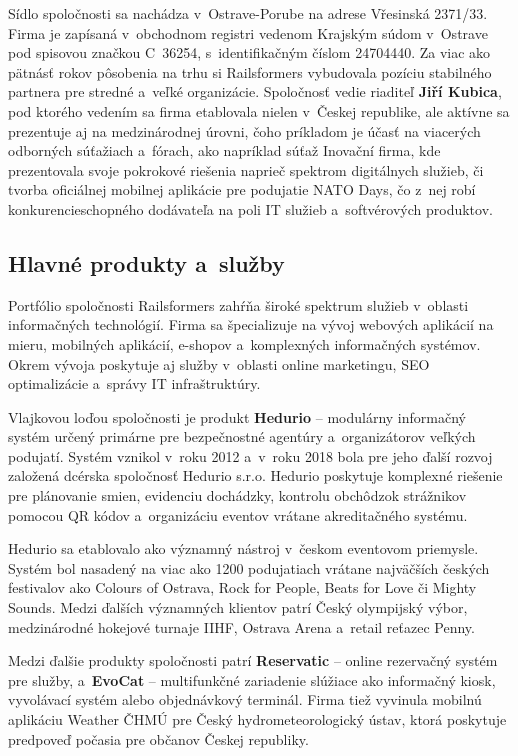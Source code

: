 Sídlo spoločnosti sa nachádza v~Ostrave-Porube na adrese Vřesinská 2371/33. Firma je zapísaná v~obchodnom registri vedenom Krajským súdom v~Ostrave pod spisovou značkou C~36254, s~identifikačným číslom 24704440. Za viac ako pätnásť rokov pôsobenia na trhu si Railsformers vybudovala pozíciu stabilného partnera pre stredné a~veľké organizácie. Spoločnosť vedie riaditeľ \textbf{Jiří Kubica}, pod ktorého vedením sa firma etablovala nielen v~Českej republike, ale aktívne sa prezentuje aj na medzinárodnej úrovni, čoho príkladom je účasť na viacerých odborných súťažiach a~fórach, ako napríklad súťaž Inovační firma, kde prezentovala svoje pokrokové riešenia naprieč spektrom digitálnych služieb, či tvorba oficiálnej mobilnej aplikácie pre podujatie NATO Days, čo z~nej robí konkurencieschopného dodávateľa na poli IT služieb a~softvérových produktov.

\subsection{Hlavné produkty a~služby}
\label{sec:Produkty}

Portfólio spoločnosti Railsformers zahŕňa široké spektrum služieb v~oblasti informačných technológií. Firma sa špecializuje na vývoj webových aplikácií na mieru, mobilných aplikácií, e-shopov a~komplexných informačných systémov. Okrem vývoja poskytuje aj služby v~oblasti online marketingu, SEO optimalizácie a~správy IT infraštruktúry.

Vlajkovou loďou spoločnosti je produkt \textbf{Hedurio} -- modulárny informačný systém určený primárne pre bezpečnostné agentúry a~organizátorov veľkých podujatí. Systém vznikol v~roku 2012 a~v~roku 2018 bola pre jeho ďalší rozvoj založená dcérska spoločnosť Hedurio s.r.o. Hedurio poskytuje komplexné riešenie pre plánovanie smien, evidenciu dochádzky, kontrolu obchôdzok strážnikov pomocou QR kódov a~organizáciu eventov vrátane akreditačného systému.

Hedurio sa etablovalo ako významný nástroj v~českom eventovom priemysle. Systém bol nasadený na viac ako 1200 podujatiach vrátane najväčších českých festivalov ako Colours of Ostrava, Rock for People, Beats for Love či Mighty Sounds. Medzi ďalších významných klientov patrí Český olympijský výbor, medzinárodné hokejové turnaje IIHF, Ostrava Arena a~retail reťazec Penny.

Medzi ďalšie produkty spoločnosti patrí \textbf{Reservatic} -- online rezervačný systém pre služby, a~\textbf{EvoCat} -- multifunkčné zariadenie slúžiace ako informačný kiosk, vyvolávací systém alebo objednávkový terminál. Firma tiež vyvinula mobilnú aplikáciu Weather ČHMÚ pre Český hydrometeorologický ústav, ktorá poskytuje predpoveď počasia pre občanov Českej republiky.


